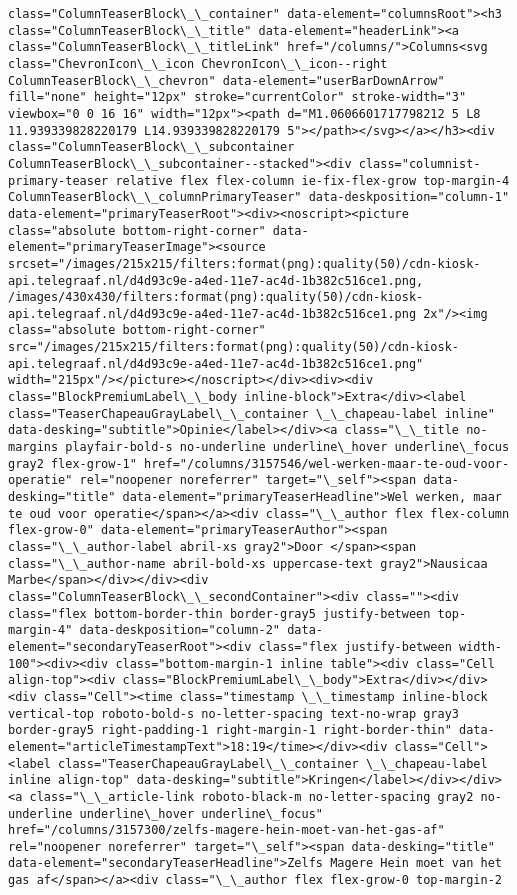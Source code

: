 \documentclass[11pt]{article}
\begin{document}
\begin{Verbatim}[commandchars=\\\{\}]
class="ColumnTeaserBlock\_\_container" data-element="columnsRoot"><h3 class="ColumnTeaserBlock\_\_title" data-element="headerLink"><a class="ColumnTeaserBlock\_\_titleLink" href="/columns/">Columns<svg class="ChevronIcon\_\_icon ChevronIcon\_\_icon--right ColumnTeaserBlock\_\_chevron" data-element="userBarDownArrow" fill="none" height="12px" stroke="currentColor" stroke-width="3" viewbox="0 0 16 16" width="12px"><path d="M1.0606601717798212 5 L8 11.939339828220179 L14.939339828220179 5"></path></svg></a></h3><div class="ColumnTeaserBlock\_\_subcontainer ColumnTeaserBlock\_\_subcontainer--stacked"><div class="columnist-primary-teaser relative flex flex-column ie-fix-flex-grow top-margin-4 ColumnTeaserBlock\_\_columnPrimaryTeaser" data-deskposition="column-1" data-element="primaryTeaserRoot"><div><noscript><picture class="absolute bottom-right-corner" data-element="primaryTeaserImage"><source srcset="/images/215x215/filters:format(png):quality(50)/cdn-kiosk-api.telegraaf.nl/d4d93c9e-a4ed-11e7-ac4d-1b382c516ce1.png, /images/430x430/filters:format(png):quality(50)/cdn-kiosk-api.telegraaf.nl/d4d93c9e-a4ed-11e7-ac4d-1b382c516ce1.png 2x"/><img class="absolute bottom-right-corner" src="/images/215x215/filters:format(png):quality(50)/cdn-kiosk-api.telegraaf.nl/d4d93c9e-a4ed-11e7-ac4d-1b382c516ce1.png" width="215px"/></picture></noscript></div><div><div class="BlockPremiumLabel\_\_body inline-block">Extra</div><label class="TeaserChapeauGrayLabel\_\_container \_\_chapeau-label inline" data-desking="subtitle">Opinie</label></div><a class="\_\_title no-margins playfair-bold-s no-underline underline\_hover underline\_focus gray2 flex-grow-1" href="/columns/3157546/wel-werken-maar-te-oud-voor-operatie" rel="noopener noreferrer" target="\_self"><span data-desking="title" data-element="primaryTeaserHeadline">Wel werken, maar te oud voor operatie</span></a><div class="\_\_author flex flex-column flex-grow-0" data-element="primaryTeaserAuthor"><span class="\_\_author-label abril-xs gray2">Door </span><span class="\_\_author-name abril-bold-xs uppercase-text gray2">Nausicaa Marbe</span></div></div><div class="ColumnTeaserBlock\_\_secondContainer"><div class=""><div class="flex bottom-border-thin border-gray5 justify-between top-margin-4" data-deskposition="column-2" data-element="secondaryTeaserRoot"><div class="flex justify-between width-100"><div><div class="bottom-margin-1 inline table"><div class="Cell align-top"><div class="BlockPremiumLabel\_\_body">Extra</div></div><div class="Cell"><time class="timestamp \_\_timestamp inline-block vertical-top roboto-bold-s no-letter-spacing text-no-wrap gray3 border-gray5 right-padding-1 right-margin-1 right-border-thin" data-element="articleTimestampText">18:19</time></div><div class="Cell"><label class="TeaserChapeauGrayLabel\_\_container \_\_chapeau-label inline align-top" data-desking="subtitle">Kringen</label></div></div><a class="\_\_article-link roboto-black-m no-letter-spacing gray2 no-underline underline\_hover underline\_focus" href="/columns/3157300/zelfs-magere-hein-moet-van-het-gas-af" rel="noopener noreferrer" target="\_self"><span data-desking="title" data-element="secondaryTeaserHeadline">Zelfs Magere Hein moet van het gas af</span></a><div class="\_\_author flex flex-grow-0 top-margin-2 
\end{Verbatim}
\end{document}
